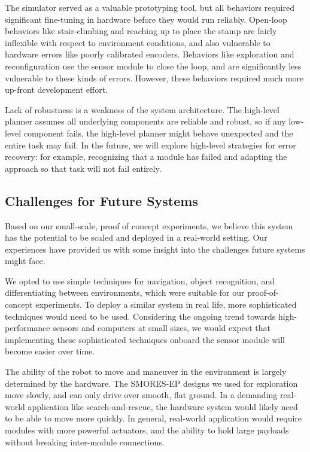 \documentclass[conference]{IEEEtran}
\newcommand{\TODO}[1]{ {\bf \textcolor{red}{TODO:} #1 }}
\begin{document}
The simulator served as a valuable prototyping tool, but all behaviors required significant
fine-tuning in hardware
before they would run reliably.  
Open-loop behaviors like stair-climbing and reaching up to place the stamp are fairly
inflexible with respect to environment conditions, and also vulnerable to hardware
errors like poorly calibrated encoders.  
Behaviors like exploration and reconfiguration use the sensor module to close the
loop, and are significantly less vulnerable to these kinds of errors.  
However, these behaviors required much more up-front development effort.

Lack of robustness is  a weakness of the system architecture.  The high-level planner assumes all underlying components are reliable and robust, so if any low-level component fails, the high-level planner might behave unexpected and the entire task may fail. In the future, we will explore high-level strategies for error recovery: for example, recognizing that a module has failed and adapting the approach so that task will not fail entirely.
%
\subsection{Challenges for Future Systems}
%
Based on our small-scale, proof of concept experiments, we believe this system has the potential to be scaled and deployed in a real-world setting. Our experiences have provided us with some insight into the challenges future systems might face.

We opted to use simple techniques for navigation, object recognition, and differentiating between environments, which were suitable for our proof-of-concept experiments. To deploy a similar system in real life, more sophisticated techniques would need to be used.  Considering the ongoing trend towards high-performance sensors and computers at small sizes, we would expect that implementing these sophisticated techniques onboard the sensor module will become easier over time.

The ability of the robot to move and maneuver in the environment is largely determined by the hardware.  The SMORES-EP designs we used for exploration move slowly,
 and can only drive over smooth, flat ground.  In a demanding real-world application like search-and-rescue, the hardware system would likely need to be able to move more quickly.  In general, real-world application would require modules with more powerful actuators, and the ability to hold large payloads without breaking inter-module connections.
\end{document}
